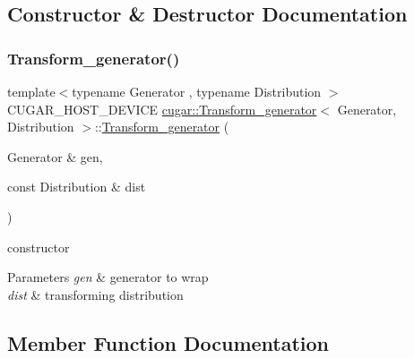 \subsection{Constructor \& Destructor Documentation}
\mbox{\label{structcugar_1_1_transform__generator_a1ed65c84f620be6c7278948cb8ad92fc}} 
\subsubsection{\texorpdfstring{Transform\+\_\+generator()}{Transform\_generator()}}
{\footnotesize\ttfamily template$<$typename Generator , typename Distribution $>$ \\
C\+U\+G\+A\+R\+\_\+\+H\+O\+S\+T\+\_\+\+D\+E\+V\+I\+CE \hyperlink{structcugar_1_1_transform__generator}{cugar\+::\+Transform\+\_\+generator}$<$ Generator, Distribution $>$\+::\hyperlink{structcugar_1_1_transform__generator}{Transform\+\_\+generator} (\begin{DoxyParamCaption}\item[{Generator \&}]{gen,  }\item[{const Distribution \&}]{dist }\end{DoxyParamCaption})\hspace{0.3cm}{\ttfamily [inline]}}

constructor


\begin{DoxyParams}{Parameters}
{\em gen} & generator to wrap \\
\hline
{\em dist} & transforming distribution \\
\hline
\end{DoxyParams}


\subsection{Member Function Documentation}
\mbox{\label{structcugar_1_1_transform__generator_a8bf089696f88138fba2636a6215adf33}} 
